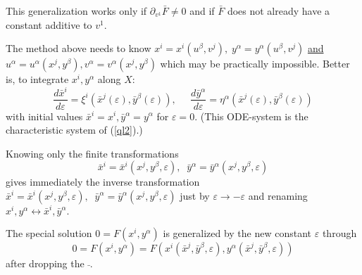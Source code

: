 This generalization works only if $\partial_{v^1}\bar{F} \neq 0$ and
if $\bar{F}$ does not already have
a constant additive to $v^1$.

The method above needs to know $x^i=x^i(u^\beta,v^j),\;
y^\alpha=y^\alpha(u^\beta,v^j)$ \underline{and}
$u^\alpha = u^\alpha(x^j,y^\beta), v^\alpha = v^\alpha(x^j,y^\beta)$
which may be practically impossible.
Better is, to integrate $x^i,y^\alpha$ along $X$:
\begin{equation}
\frac{d\bar{x}^i}{d\varepsilon} = \xi^i(\bar{x}^j(\varepsilon),
                                  \bar{y}^\beta(\varepsilon)), \;\;\;\;\;
\frac{d\bar{y}^\alpha}{d\varepsilon} = \eta^\alpha(\bar{x}^j(\varepsilon),
                                       \bar{y}^\beta(\varepsilon))
\label{ODEsys}
\end{equation}
with initial values $\bar{x}^i = x^i, \bar{y}^\alpha = y^\alpha$
for $\varepsilon = 0.$
(This ODE-system is the characteristic system of (\ref{ql2}).)

Knowing only the finite transformations
\begin{equation}
\bar{x}^i = \bar{x}^i(x^j,y^\beta,\varepsilon),\;\;
\bar{y}^\alpha = \bar{y}^\alpha(x^j,y^\beta,\varepsilon)  \label{ODEsol}
\end{equation}
gives immediately the inverse transformation
$\bar{x}^i = \bar{x}^i(x^j,y^\beta,\varepsilon),\;\;
\bar{y}^\alpha = \bar{y}^\alpha(x^j,y^\beta,\varepsilon)$
just by $\varepsilon \rightarrow -\varepsilon$ and renaming
$x^i,y^\alpha \leftrightarrow \bar{x}^i,\bar{y}^\alpha.$

The special solution $0 = F(x^i,y^\alpha)$
is generalized by the new constant
$\varepsilon$ through
\[ 0 = F(x^i,y^\alpha) = F(x^i(\bar{x}^j,\bar{y}^\beta,\varepsilon),
                  y^\alpha(\bar{x}^j,\bar{y}^\beta,\varepsilon)) \]
after dropping the $\bar{~}$.

